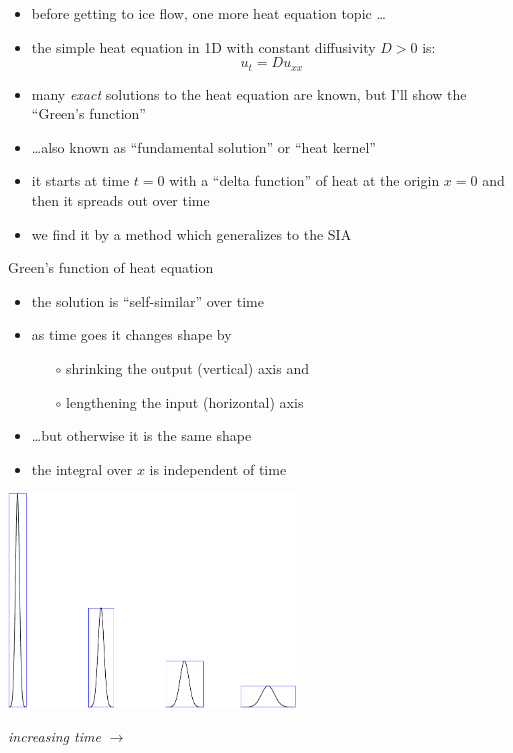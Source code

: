 \documentclass[titlepage,letterpaper,final,11pt]{scrartcl}
\begin{document}
\begin{itemize}
\item before getting to ice flow, one more heat equation topic \dots
\item the simple heat equation in 1D with constant diffusivity $D>0$ is:
	$$u_t = D u_{xx}$$
\item many \emph{exact} solutions to the heat equation are known, but I'll show the ``Green's function''
\item \dots also known as ``fundamental solution'' or ``heat kernel''
\item it starts at time $t=0$ with a ``delta function'' of heat at the origin $x=0$ and then it spreads out over time
\item we find it by a method which generalizes to the SIA
\end{itemize}

Green's function of heat equation

\begin{itemize}
\item the solution is ``self-similar'' over time
\item as time goes it changes shape by
  \begin{itemize}
  \item[$\circ$] shrinking the output (vertical) axis and
  \item[$\circ$] lengthening the input (horizontal) axis
  \end{itemize}
\item \dots but otherwise it is the same shape
\item the integral over $x$ is independent of time
\end{itemize}

\begin{center}
\includegraphics[width=3.0in]{heatscaling}

\emph{increasing time} $\to$
\end{center}
\end{document}
